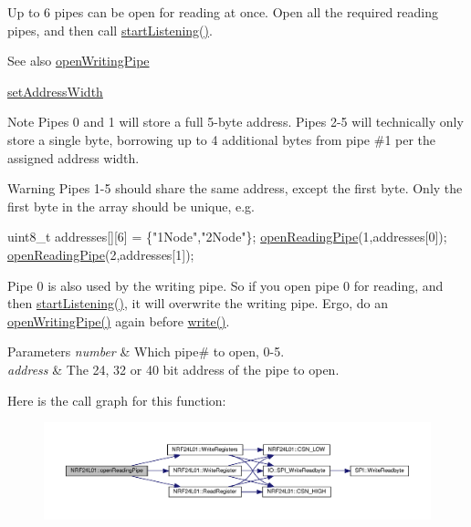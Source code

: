 Up to 6 pipes can be open for reading at once. Open all the required reading pipes, and then call \hyperlink{classNRF24L01_aaabd39829998b609c0dc317af4f141b2}{start\+Listening()}.

\begin{DoxySeeAlso}{See also}
\hyperlink{classNRF24L01_ad64a887cae746be5ca43cf08445feed9}{open\+Writing\+Pipe} 

\hyperlink{classNRF24L01_a17752733515f67aa9f6ed3daa1ed3d1d}{set\+Address\+Width}
\end{DoxySeeAlso}
\begin{DoxyNote}{Note}
Pipes 0 and 1 will store a full 5-\/byte address. Pipes 2-\/5 will technically only store a single byte, borrowing up to 4 additional bytes from pipe \#1 per the assigned address width. 
\end{DoxyNote}
\begin{DoxyWarning}{Warning}
Pipes 1-\/5 should share the same address, except the first byte. Only the first byte in the array should be unique, e.\+g. 
\begin{DoxyCode}
uint8\_t addresses[][6] = \{\textcolor{stringliteral}{"1Node"},\textcolor{stringliteral}{"2Node"}\};
\hyperlink{classNRF24L01_a9b458f77f6ae6c42f330710e703dd847}{openReadingPipe}(1,addresses[0]);
\hyperlink{classNRF24L01_a9b458f77f6ae6c42f330710e703dd847}{openReadingPipe}(2,addresses[1]);
\end{DoxyCode}


Pipe 0 is also used by the writing pipe. So if you open pipe 0 for reading, and then \hyperlink{classNRF24L01_aaabd39829998b609c0dc317af4f141b2}{start\+Listening()}, it will overwrite the writing pipe. Ergo, do an \hyperlink{classNRF24L01_ad64a887cae746be5ca43cf08445feed9}{open\+Writing\+Pipe()} again before \hyperlink{classNRF24L01_a719390c69a2e45df08379f17e3289f4c}{write()}.
\end{DoxyWarning}

\begin{DoxyParams}{Parameters}
{\em number} & Which pipe\# to open, 0-\/5. \\
\hline
{\em address} & The 24, 32 or 40 bit address of the pipe to open. \\
\hline
\end{DoxyParams}


Here is the call graph for this function\+:\nopagebreak
\begin{figure}[H]
\begin{center}
\leavevmode
\includegraphics[width=350pt]{classNRF24L01_a9b458f77f6ae6c42f330710e703dd847_cgraph}
\end{center}
\end{figure}


